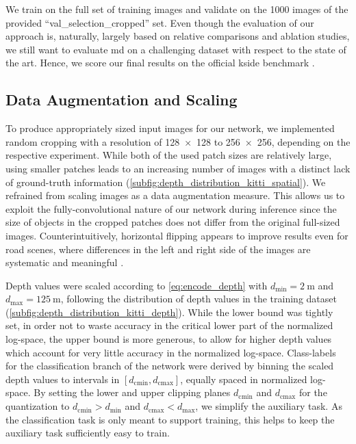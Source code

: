 \documentclass[lang=english]{tumarxivarticle}
\newcommand{\citep}{\parencite}
\begin{document}
We train on the full set of training images and validate on the \num{1000} images of the provided ``val\_selection\_cropped'' set.
Even though the evaluation of our approach is, naturally, largely based on relative comparisons and ablation studies, we still want to evaluate \gls{md} on a challenging dataset with respect to the state of the art.
Hence, we score our final results on the official \gls{kside} benchmark \citep{Uhrig17}.


\subsection{Data Augmentation and Scaling}

To produce appropriately sized input images for our network, we implemented random cropping with a resolution of \SI{128x128}{\pixel} to \SI{256x256}{\pixel}, depending on the respective experiment.
While both of the used patch sizes are relatively large, using smaller patches leads to an increasing number of images with a distinct lack of ground-truth information (\cf \cref{subfig:depth_distribution_kitti_spatial}).
We refrained from scaling images as a data augmentation measure.
This allows us to exploit the fully-convolutional nature of our network during inference since the size of objects in the cropped patches does not differ from the original full-sized images.
Counterintuitively, horizontal flipping appears to improve results even for road scenes, where differences in the left and right side of the images are systematic and meaningful \citep{Romera18}.

Depth values were scaled according to \cref{eq:encode_depth} with $d_\text{min} = \SI{2}{\meter}$ and $d_\text{max} = \SI{125}{\meter}$, following the distribution of depth values in the training dataset (\cf \cref{subfig:depth_distribution_kitti_depth}).
While the lower bound was tightly set, in order not to waste accuracy in the critical lower part of the normalized log-space, the upper bound is more generous, to allow for higher depth values which account for very little accuracy in the normalized log-space.
Class-labels for the classification branch of the network were derived by binning the scaled depth values to intervals in $\left[ d_\text{cmin}, d_\text{cmax}\right]$, equally spaced in normalized log-space.
By setting the lower and upper clipping planes $d_\text{cmin}$ and $d_\text{cmax}$ for the quantization to $d_\text{cmin} > d_\text{min}$ and $d_\text{cmax} < d_\text{max}$, we simplify the auxiliary task.
As the classification task is only meant to support training, this helps to keep the auxiliary task sufficiently easy to train.
\end{document}
